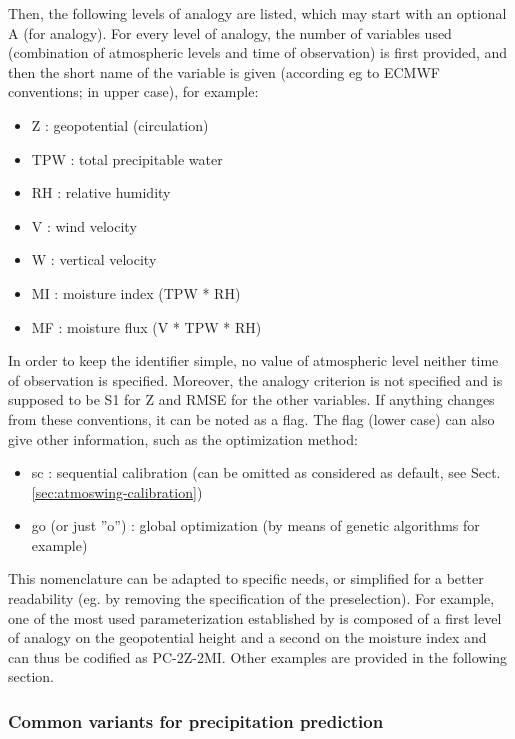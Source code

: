 \documentclass[review]{elsarticle}
\begin{document}
Then, the following levels of analogy are listed, which may start with an optional A (for analogy). For every level of analogy, the number of variables used (combination of atmospheric levels and time of observation) is first provided, and then the short name of the variable is given (according eg to ECMWF conventions; in upper case), for example:
\begin{itemize}
	\setlength\itemsep{-2px}
	\item Z : geopotential (circulation)
	\item TPW : total precipitable water
	\item RH : relative humidity
	\item V : wind velocity
	\item W : vertical velocity
	\item MI : moisture index (TPW * RH)
	\item MF : moisture flux (V * TPW * RH)
\end{itemize}

In order to keep the identifier simple, no value of atmospheric level neither time of observation is specified. Moreover, the analogy criterion is not specified and is supposed to be S1 for Z and RMSE for the other variables. If anything changes from these conventions, it can be noted as a flag. The flag (lower case) can also give other information, such as the optimization method:
\begin{itemize}
	\setlength\itemsep{-2px}
	\item sc : sequential calibration (can be omitted as considered as default, see Sect. \ref{sec:atmoswing-calibration})
	\item go (or just ''o'') : global optimization (by means of genetic algorithms for example)
\end{itemize}

This nomenclature can be adapted to specific needs, or simplified for a better readability (eg. by removing the specification of the preselection). For example, one of the most used parameterization established by \citet{Bontron2004} is composed of a first level of analogy on the geopotential height and a second on the moisture index and can thus be codified as PC-2Z-2MI. Other examples are provided in the following section.


\subsubsection{Common variants for precipitation prediction}
\label{sec:method:references}
\end{document}
